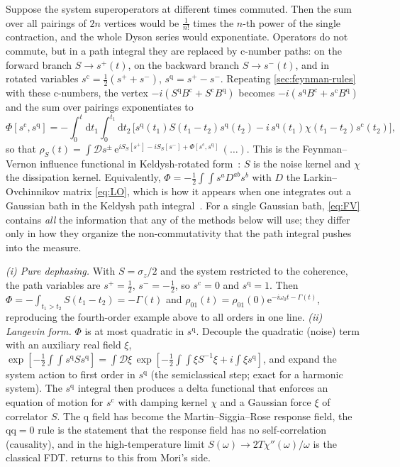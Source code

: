 \documentclass[11pt]{article}
\newcommand{\ee}{\mathrm{e}}
\newcommand{\dd}{\mathrm{d}}
\newcommand{\cl}{\mathrm{c}}
\newcommand{\qu}{\mathrm{q}}
\begin{document}
Suppose the system superoperators at different times commuted. Then the sum over all
pairings of $2n$ vertices would be $\frac{1}{n!}$ times the $n$-th power of the single
contraction, and the whole Dyson series would exponentiate. Operators do not commute,
but in a path integral they are replaced by c-number paths: on the forward branch
$S\to s^+(t)$, on the backward branch $S\to s^-(t)$, and in rotated variables
$s^\cl=\frac12(s^++s^-)$, $s^\qu=s^+-s^-$. Repeating \cref{sec:feynman-rules} with these
c-numbers, the vertex $-i(S^\qu B^\cl+S^\cl B^\qu)$ becomes $-i(s^\qu B^\cl+s^\cl B^\qu)$ and the
sum over pairings exponentiates to
\begin{equation}
  \Phi[s^\cl,s^\qu]=-\int_0^t\!\dd t_1\!\int_0^{t_1}\!\dd t_2\,
  \Big[s^\qu(t_1)S(t_1-t_2)s^\qu(t_2)-i\,s^\qu(t_1)\chi(t_1-t_2)s^\cl(t_2)\Big],
  \label{eq:FV}
\end{equation}
so that $\rho_S(t)=\int\mathcal D s^\pm\,\ee^{iS_S[s^+]-iS_S[s^-]+\Phi[s^\cl,s^\qu]}\,(\ldots)$. This is the
Feynman--Vernon influence functional in Keldysh-rotated
form~\cite{FeynmanVernon1963,Grabert1988,Weiss2012}: $S$ is the noise kernel and $\chi$
the dissipation kernel. Equivalently, $\Phi=-\frac12\int\!\!\int s^a D^{ab}s^b$ with $D$ the
Larkin--Ovchinnikov matrix \eqref{eq:LO}, which is how it appears when one integrates
out a Gaussian bath in the Keldysh path integral~\cite{Kamenev2011}. For a single
Gaussian bath, \cref{eq:FV} contains \emph{all} the information that any of the methods
below will use; they differ only in how they organize the non-commutativity that the
path integral pushes into the measure.

\begin{keybox}
\emph{(i) Pure dephasing.} With $S=\sigma_z/2$ and the system restricted to the coherence,
the path variables are $s^+=\tfrac12$, $s^-=-\tfrac12$, so $s^\cl=0$ and $s^\qu=1$. Then
$\Phi=-\int_{t_1>t_2}S(t_1-t_2)=-\Gamma(t)$ and $\rho_{01}(t)=\rho_{01}(0)\ee^{-i\omega_0t-\Gamma(t)}$,
reproducing the fourth-order example above to all orders in one line.
\emph{(ii) Langevin form.} $\Phi$ is at most quadratic in $s^\qu$. Decouple the
quadratic (noise) term with an auxiliary real field $\xi$,
$\exp[-\tfrac12\!\int\!\!\int s^\qu Ss^\qu]=\int\!\mathcal D\xi\,
\exp[-\tfrac12\!\int\!\!\int\xi S^{-1}\xi+i\!\int\!\xi s^\qu]$, and expand the system action
to first order in $s^\qu$ (the semiclassical step; exact for a harmonic system). The
$s^\qu$ integral then produces a delta functional that enforces an equation of motion
for $s^\cl$ with damping kernel $\chi$ and a Gaussian force $\xi$ of correlator $S$. The
$\qu$ field has become the Martin--Siggia--Rose response field, the $\qu\qu=0$ rule is the
statement that the response field has no self-correlation (causality), and in the
high-temperature limit $S(\omega)\to2T\chi''(\omega)/\omega$ is the classical FDT.
 returns to this from Mori's side.
\end{keybox}
\end{document}
